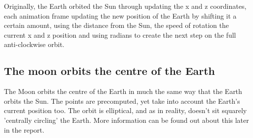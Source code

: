 \documentclass[12pt]{article}
\begin{document}
Originally, the Earth orbited the Sun through updating the x and z coordinates, each animation frame updating the new position of the Earth by shifting it a certain amount, using the distance from the Sun, the speed of rotation the current x and z position and using radians to create the next step on the full anti-clockwise orbit.

\subsection{The moon orbits the centre of the Earth}
The Moon orbits the centre of the Earth in much the same way that the Earth orbits the Sun. The points are precomputed, yet take into account the Earth's current position too. The orbit is elliptical, and as in reality, doesn't sit squarely 'centrally circling' the Earth. More information can be found out about this later in the report.
\end{document}
